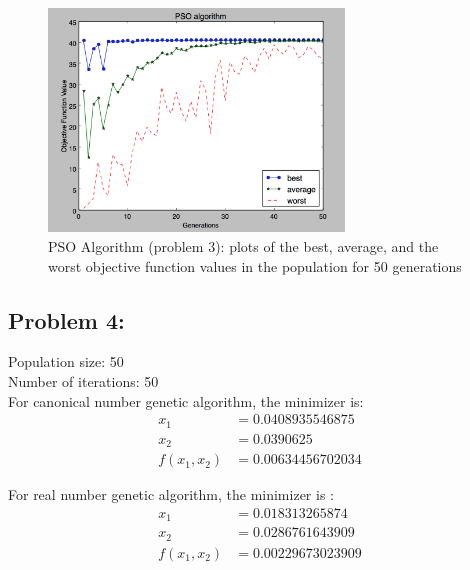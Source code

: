 \documentclass{article}
\begin{document}
\begin{figure}[h]
\includegraphics[width=0.7\textwidth]{PSO_max_best} 
\centering
\caption{PSO Algorithm (problem 3): plots of the best, average, and the worst objective function values in the population for 50 generations }

\end{figure}





\subsection*{{Problem 4: }}

Population size:  50  \\
Number of iterations:  50 \\ 
For canonical number genetic algorithm, the minimizer is: \\
\begin{align*}
x_1 & = 0.0408935546875 \\
x_2 & = 0.0390625  \\
f(x_1,x_2)  & = 0.00634456702034
\end{align*}

For real number genetic algorithm, the minimizer is : \\
\begin{align*} 
x_1 & = 0.018313265874 \\
x_2 & = 0.0286761643909 \\
f(x_1, x_2) & = 0.00229673023909
\end{align*} 
\end{document}
